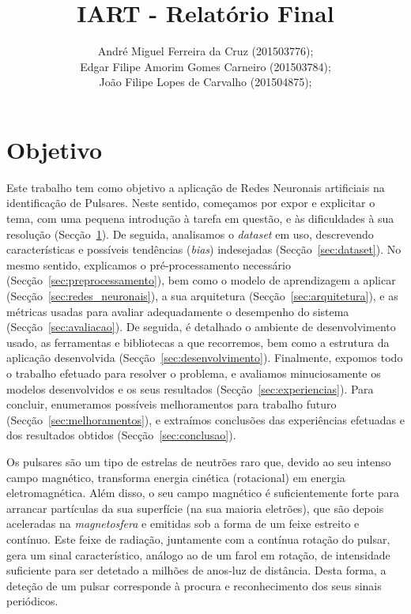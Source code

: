 \documentclass[]{article}
\title{IART - Relatório Final}
\author{
	André Miguel Ferreira da Cruz (201503776);\\
    Edgar Filipe Amorim Gomes Carneiro (201503784);\\
	João Filipe Lopes de Carvalho (201504875);\\
}
\begin{document}
\setlength{\textwidth}{18cm}
\setlength{\textheight}{22cm}



\newpage


\tableofcontents
\newpage


\section{Objetivo}
\label{sec:intro}
	Este trabalho tem como objetivo a aplicação de Redes Neuronais artificiais na identificação de Pulsares. Neste sentido, começamos por expor e explicitar o tema, com uma pequena introdução à tarefa em questão, e às dificuldades à sua resolução (Secção~\ref{sec:intro}). De seguida, analisamos o \textit{dataset} em uso, descrevendo características e possíveis tendências (\textit{bias}) indesejadas (Secção~\ref{sec:dataset}). No mesmo sentido, explicamos o pré-processamento necessário (Secção~\ref{sec:preprocessamento}), bem como o modelo de aprendizagem a aplicar (Secção~\ref{sec:redes_neuronais}), a sua arquitetura (Secção~\ref{sec:arquitetura}), e as métricas usadas para avaliar adequadamente o desempenho do sistema (Secção~\ref{sec:avaliacao}). De seguida, é detalhado o ambiente de desenvolvimento usado, as ferramentas e bibliotecas a que recorremos, bem como a estrutura da aplicação desenvolvida (Secção~\ref{sec:desenvolvimento}). Finalmente, expomos todo o trabalho efetuado para resolver o problema, e avaliamos minuciosamente os modelos desenvolvidos e os seus resultados (Secção~\ref{sec:experiencias}). Para concluir, enumeramos possíveis melhoramentos para trabalho futuro (Secção~\ref{sec:melhoramentos}), e extraímos conclusões das experiências efetuadas e dos resultados obtidos (Secção~\ref{sec:conclusao}).
	
    Os pulsares são um tipo de estrelas de neutrões raro que, devido ao seu intenso campo magnético, transforma energia cinética (rotacional) em energia eletromagnética. Além disso, o seu campo magnético é suficientemente forte para arrancar partículas da sua superfície (na sua maioria eletrões), que são depois aceleradas na \textit{magnetosfera} e emitidas sob a forma de um feixe estreito e contínuo. Este feixe de radiação, juntamente com a contínua rotação do pulsar, gera um sinal característico, análogo ao de um farol em rotação, de intensidade suficiente para ser detetado a milhões de anos-luz de distância. Desta forma, a deteção de um pulsar corresponde à procura e reconhecimento dos seus sinais periódicos.
    
\end{document}
